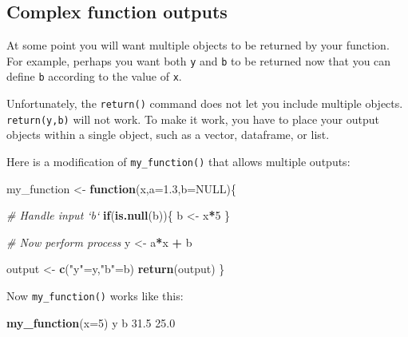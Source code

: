 \documentclass[
]{book}
\newenvironment{Shaded}{\begin{snugshade}}{\end{snugshade}}
\newcommand{\CommentTok}[1]{\textcolor[rgb]{0.56,0.35,0.01}{\textit{#1}}}
\newcommand{\ControlFlowTok}[1]{\textcolor[rgb]{0.13,0.29,0.53}{\textbf{#1}}}
\newcommand{\DataTypeTok}[1]{\textcolor[rgb]{0.13,0.29,0.53}{#1}}
\newcommand{\DecValTok}[1]{\textcolor[rgb]{0.00,0.00,0.81}{#1}}
\newcommand{\FloatTok}[1]{\textcolor[rgb]{0.00,0.00,0.81}{#1}}
\newcommand{\KeywordTok}[1]{\textcolor[rgb]{0.13,0.29,0.53}{\textbf{#1}}}
\newcommand{\NormalTok}[1]{#1}
\newcommand{\OperatorTok}[1]{\textcolor[rgb]{0.81,0.36,0.00}{\textbf{#1}}}
\newcommand{\OtherTok}[1]{\textcolor[rgb]{0.56,0.35,0.01}{#1}}
\newcommand{\StringTok}[1]{\textcolor[rgb]{0.31,0.60,0.02}{#1}}
\begin{document}
\hypertarget{complex-function-outputs}{%
\subsection*{Complex function outputs}\label{complex-function-outputs}}

At some point you will want multiple objects to be returned by your function. For example, perhaps you want both \texttt{y} and \texttt{b} to be returned now that you can define \texttt{b} according to the value of \texttt{x}.

Unfortunately, the \texttt{return()} command does not let you include multiple objects. \texttt{return(y,b)} will not work. To make it work, you have to place your output objects within a single object, such as a vector, dataframe, or list.

Here is a modification of \texttt{my\_function()} that allows multiple outputs:

\begin{Shaded}
\begin{Highlighting}[]
\NormalTok{my_function <-}\StringTok{ }\ControlFlowTok{function}\NormalTok{(x,}\DataTypeTok{a=}\FloatTok{1.3}\NormalTok{,}\DataTypeTok{b=}\OtherTok{NULL}\NormalTok{)\{}
  
  \CommentTok{# Handle input `b`}
  \ControlFlowTok{if}\NormalTok{(}\KeywordTok{is.null}\NormalTok{(b))\{}
\NormalTok{    b <-}\StringTok{ }\NormalTok{x}\OperatorTok{*}\DecValTok{5}
\NormalTok{  \}}
  
  \CommentTok{# Now perform process}
\NormalTok{  y <-}\StringTok{ }\NormalTok{a}\OperatorTok{*}\NormalTok{x }\OperatorTok{+}\StringTok{ }\NormalTok{b}
  
\NormalTok{  output <-}\StringTok{ }\KeywordTok{c}\NormalTok{(}\StringTok{"y"}\NormalTok{=y,}\StringTok{"b"}\NormalTok{=b) }
  \KeywordTok{return}\NormalTok{(output)}
\NormalTok{\}}
\end{Highlighting}
\end{Shaded}

Now \texttt{my\_function()} works like this:

\begin{Shaded}
\begin{Highlighting}[]
\KeywordTok{my_function}\NormalTok{(}\DataTypeTok{x=}\DecValTok{5}\NormalTok{)}
\NormalTok{   y    b }
\FloatTok{31.5} \FloatTok{25.0} 
\end{Highlighting}
\end{Shaded}
\end{document}
